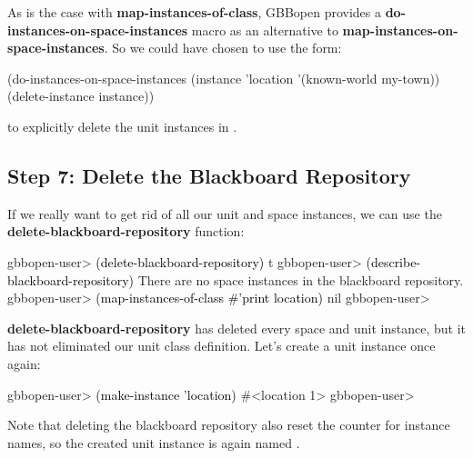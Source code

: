 \documentclass[10pt,twoside,english,pdftex]{article}
\begin{document}
%
%
As is the case with \textbf{map-instances-of-class}, GBBopen provides a
\textbf{do-instances-on-space-instances} macro as an alternative to
\textbf{map-instances-on-space-instances}.  So we could have chosen to use the
form:
%
\W\supp
\begin{example}
\textcolor{darkergray}{%
  (do-instances-on-space-instances (instance 'location '(known-world my-town))
    (delete-instance instance))}
\end{example}
%
to explicitly delete the  unit instances in .

\subsection*{Step 7: Delete the Blackboard Repository}

%
%
%
If we really want to get rid of all our unit and space instances, we can use
the \textbf{delete-blackboard-repository} function:
%
\W\supp
\begin{example}
\textcolor{darkergray}{%
  gbbopen-user> \textcolor{black}{(delete-blackboard-repository)}
  t
  gbbopen-user> \textcolor{black}{(describe-blackboard-repository)}
  There are no space instances in the blackboard repository.
  gbbopen-user> \textcolor{black}{(map-instances-of-class #'print location)}
  nil
  gbbopen-user>}
\end{example}

%
\textbf{delete-blackboard-repository} has deleted every space and unit
instance, but it has not eliminated our  unit class definition.
Let's create a  unit instance once again:
%
\W\supp
\begin{example}
\textcolor{darkergray}{%
  gbbopen-user> \textcolor{black}{(make-instance 'location)}
  #<location 1>
  gbbopen-user>}
\end{example}
%
Note that deleting the blackboard repository also reset the counter for
 instance names, so the created unit instance is again named
.


\T\markright{}%
\T\pagestyle{plain}
\T\cleardoublepage
\W{}
\T\pagestyle{fancy}
\T\thispagestyle{fancybottom}
\T\renewcommand{\headrulewidth}{0pt}
\end{document}
